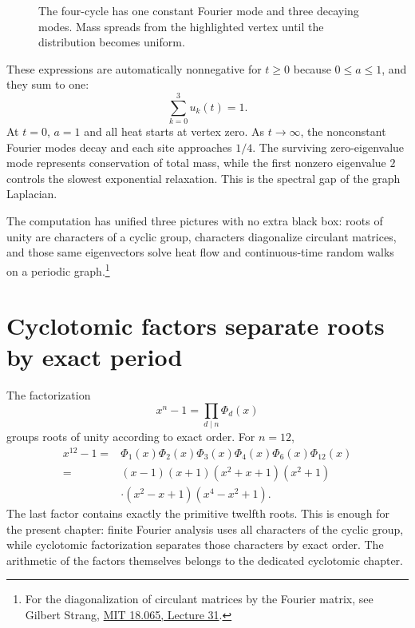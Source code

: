 \begin{figure}[H]
\centering
{}
\caption{The four-cycle has one constant Fourier mode and three decaying modes. Mass spreads from the highlighted vertex until the distribution becomes uniform.}
\end{figure}

These expressions are automatically nonnegative for $t\ge0$ because $0\le a\le1$, and they sum to one:
\[
 \sum_{k=0}^3u_k(t)=1.
\]
At $t=0$, $a=1$ and all heat starts at vertex zero. As $t\to\infty$, the nonconstant Fourier modes decay and each site approaches $1/4$. The surviving zero-eigenvalue mode represents conservation of total mass, while the first nonzero eigenvalue $2$ controls the slowest exponential relaxation. This is the spectral gap of the graph Laplacian.

The computation has unified three pictures with no extra black box: roots of unity are characters of a cyclic group, characters diagonalize circulant matrices, and those same eigenvectors solve heat flow and continuous-time random walks on a periodic graph.\footnote{For the diagonalization of circulant matrices by the Fourier matrix, see Gilbert Strang, \href{https://ocw.mit.edu/courses/18-065-matrix-methods-in-data-analysis-signal-processing-and-machine-learning-spring-2018/resources/lecture-31-eigenvectors-of-circulant-matrices-fourier-matrix/index.html}{MIT 18.065, Lecture 31}.}

\section{Cyclotomic factors separate roots by exact period}

The factorization
\[
  x^n-1=\prod_{d\mid n}\Phi_d(x)
\]
groups roots of unity according to exact order.  For \(n=12\),
\[
\begin{aligned}
  x^{12}-1
  ={}&\Phi_1(x)\Phi_2(x)\Phi_3(x)
      \Phi_4(x)\Phi_6(x)\Phi_{12}(x)\\
  ={}&(x-1)(x+1)(x^2+x+1)(x^2+1)\\
     &\cdot(x^2-x+1)(x^4-x^2+1).
\end{aligned}
\]
The last factor contains exactly the primitive twelfth roots.  This is enough for the present chapter: finite Fourier analysis uses all characters of the cyclic group, while cyclotomic factorization separates those characters by exact order.  The arithmetic of the factors themselves belongs to the dedicated cyclotomic chapter.


